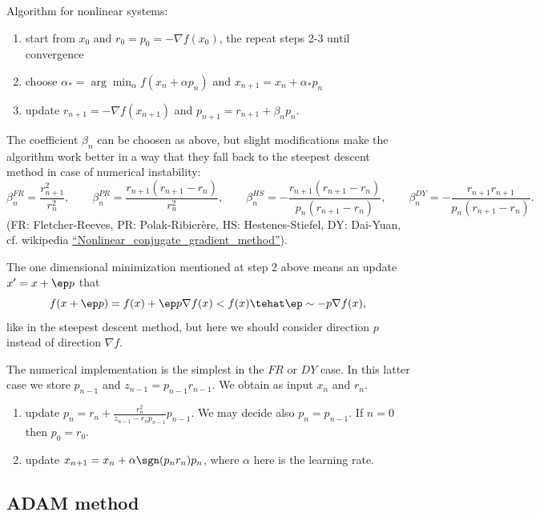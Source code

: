 \documentclass[10pt,a4paper]{article}
\begin{document}
Algorithm for nonlinear systems:
\begin{enumerate}
\item start from $x_0$ and $r_0=p_0= -\nabla f(x_0)$, the repeat steps 2-3 until convergence
\item choose $\alpha_*= \arg\min_\alpha f(x_n+\alpha p_n)$ and $x_{n+1}=x_n+\alpha_*p_n$
\item update $r_{n+1}=-\nabla f(x_{n+1})$ and $p_{n+1}= r_{n+1}+\beta_np_n$.
\end{enumerate}
The coefficient $\beta_n$ can be choosen as above, but slight modifications make the algorithm work better in a way that they fall back to the steepest descent method in case of numerical instability:
\begin{equation}
  \beta^{FR}_n=\frac{r_{n+1}^2}{r_n^2},\qquad
  \beta^{PR}_n=\frac{r_{n+1}(r_{n+1}-r_n)}{r_n^2},\qquad
  \beta^{HS}_n=-\frac{r_{n+1}(r_{n+1}-r_n)}{p_n(r_{n+1}-r_n)},\qquad
  \beta^{DY}_n=-\frac{r_{n+1}r_{n+1}}{p_n(r_{n+1}-r_n)}.
\end{equation}
(FR: Fletcher-Reeves, PR: Polak-Ribier\`ere, HS: Hestenes-Stiefel, DY: Dai-Yuan, cf. wikipedia \href{https://en.wikipedia.org/wiki/Nonlinear_conjugate_gradient_method}{``Nonlinear\_conjugate\_gradient\_method''}).

The one dimensional minimization mentioned at step 2 above means an update $x'=x+ \ep p$ that
\begin{equation}
  f(x+\ep p) = f(x) + \ep p\nabla f(x) < f(x) \tehat \ep \sim -p\nabla f(x),
\end{equation}
like in the steepest descent method, but here we should consider direction $p$ instead of direction $\nabla f$.

The numerical implementation is the simplest in the $FR$ or $DY$ case. In this latter case we store $p_{n-1}$ and $z_{n-1}=p_{n-1}r_{n-1}$. We obtain as input $x_n$ and $r_n$.
\begin{enumerate}
\item update $\displaystyle p_n = r_n +\frac{r_n^2}{z_{n-1}-r_np_{n-1}} p_{n-1}$. We may decide also $p_n=p_{n-1}$. If  $n=0$ then $p_0=r_0$.
\item update $x_{n+1} = x_n + \alpha \sgn(p_n r_n) p_n$, where $\alpha$ here is the learning rate.
\end{enumerate}

\subsection{ADAM method}
\end{document}
